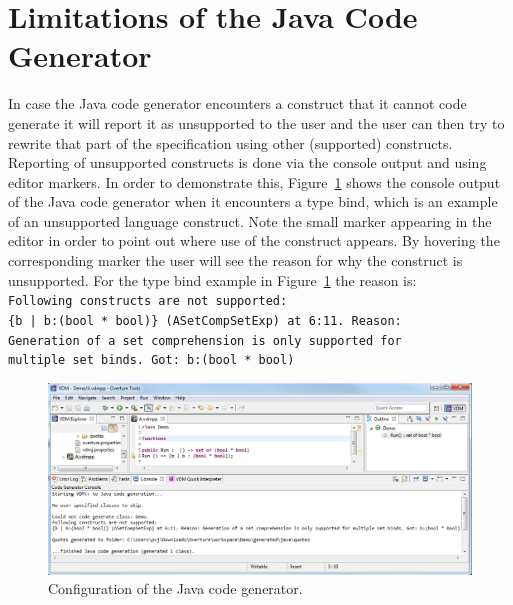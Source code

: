 \documentclass{overturerepchap}
\begin{document}
\section{Limitations of the Java Code Generator}

In case the Java code generator encounters a construct that it cannot code generate it will report it as unsupported to the user and the user can then try to rewrite that part of the specification using other (supported) constructs. Reporting of unsupported constructs is done via the console output and using editor markers. In order to demonstrate this, Figure~\ref{fig:javacg_unsupported} shows the console output of the Java code generator when it encounters a type bind, which is an example of an unsupported language construct. Note the small marker appearing in the editor in order to point out where use of the construct appears. By hovering the corresponding marker the user will see the reason for why the construct is unsupported. For the type bind example in Figure~\ref{fig:javacg_unsupported} the reason is:\\

\noindent \texttt{Following constructs are not supported:\\ \{b | b:(bool * bool)\} (ASetCompSetExp) at 6:11. Reason:\\Generation of a set comprehension is only supported for\\multiple set binds. Got: b:(bool * bool)}\\

\begin{figure}[htbp]
\begin{center}
\includegraphics[width=\linewidth]{screenDumps/javacg_unsupported}
\caption{Configuration of the Java code generator.\label{fig:javacg_unsupported}}
\end{center}
\end{figure}
\end{document}

